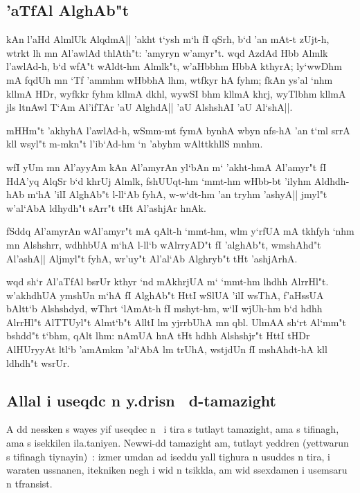 \documentclass[a4paper,11pt]{article}
\begin{document}
\subsection{'aTfAl AlghAb"t}

kAn l'aHd AlmlUk AlqdmA|| 'akht t`ysh m`h fI qSrh, b`d 'an mAt-t
zUjt-h, wtrkt lh mn Al'awlAd thlAth"t: 'amyryn w'amyr"t. wqd AzdAd Hbb
Almlk l'awlAd-h, b`d wfA"t wAldt-hm Almlk"t, w'aHbbhm HbbA kthyrA;
ly`wwDhm mA fqdUh mn `Tf 'ammhm wHbbhA lhm, wtfkyr hA fyhm; fkAn ys'al
`nhm kllmA HDr, wyfkkr fyhm kllmA dkhl, wywSI bhm kllmA khrj, wyTlbhm
kllmA jls ltnAwl T`Am Al'ifTAr 'aU AlghdA|| 'aU AlshshAI 'aU Al`shA||.

mHHm"t 'akhyhA l'awlAd-h, wSmm-mt fymA bynhA wbyn nfs-hA 'an t`ml srrA
kll wsyl"t m-mkn"t l'ib`Ad-hm `n 'abyhm wAlttkhllS mnhm.

wfI yUm mn Al'ayyAm kAn Al'amyrAn yl`bAn m` 'akht-hmA Al'amyr"t fI
HdA'yq AlqSr b`d khrUj Almlk, fshUUqt-hm `mmt-hm wHbb-bt 'ilyhm
Aldhdh-hAb m`hA 'ilI AlghAb"t l-ll`Ab fyhA, w-w`dt-hm 'an tryhm
'ashyA|| jmyl"t w'al`AbA ldhydh"t sArr"t tHt Al'ashjAr hnAk.

fSddq Al'amyrAn wAl'amyr"t mA qAlt-h `mmt-hm, wlm y`rfUA mA tkhfyh
`nhm mn Alshshrr, wdhhbUA m`hA l-ll`b wAlrryAD"t fI 'alghAb"t,
wmshAhd"t Al'ashA|| Aljmyl"t fyhA, wr'uy"t Al'al`Ab Alghryb"t tHt
'ashjArhA.

wqd sh`r Al'aTfAl bsrUr kthyr `nd mAkhrjUA m` `mmt-hm lhdhh
AlrrHl"t. w'akhdhUA ymshUn m`hA fI AlghAb"t HttI wSlUA 'ilI wsThA,
f'aHssUA bAltt`b Alshshdyd, wThrt `lAmAt-h fI mshyt-hm, w`lI wjUh-hm
b`d hdhh AlrrHl"t AlTTUyl"t Almt`b"t AlltI lm yjrrbUhA mn qbl.  UlmAA
sh`rt Al`mm"t bshdd"t t`bhm, qAlt lhm: nAmUA hnA tHt hdhh Alshshjr"t
HttI tHDr AlHUryyAt ltl`b 'amAmkm 'al`AbA lm trUhA, wstjdUn fI
mshAhdt-hA kll ldhdh"t wsrUr.  \popocplist

\pushocplist\ArabicBerberOCP

\subsection{Allal i useqdc n y.drisn \OMEGA\ d-tamazight}


A dd nessken s wayes yif useqdec n \OMEGA\ i tira s tutlayt tamazight,
ama s tifinagh, ama s isekkilen ila.taniyen. Newwi-dd tamazight am,
tutlayt yeddren (yettwarun s tifinagh tiynayin)~: izmer umdan ad
iseddu yall tighura n usuddes n tira, i waraten ussnanen, itekniken
negh i wid n tsikkla, am wid ssexdamen i usemsaru n tfransist.
\end{document}
